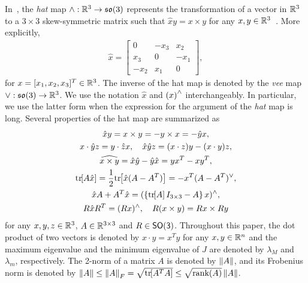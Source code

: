 \documentclass[10pt,fleqn]{IJCAS}  %
\begin{document}
\begin{multicols}{2}
In~, the \textit{hat} map $\wedge :\mathbb{R}^{3}\rightarrow\mathfrak{so}(3)$ represents the transformation of a vector in $\mathbb{R}^{3}$ to a $3\times 3$ skew-symmetric matrix such that $\hat x y = x\times y$ for any $x,y\in\mathbb{R}^{3}$~\cite{bullo2004}. 
More explicitly,
\begin{align*}
    \hat x = \begin{bmatrix} 0 & -x_3 & x_2 \\ x_3 & 0 & -x_1 \\ -x_2 & x_1 & 0\end{bmatrix},
\end{align*}
for $x=[x_1,x_2,x_3]^T\in\mathbb{R}^{3}$. 
The inverse of the hat map is denoted by the \textit{vee} map $\vee:\mathfrak{so}(3)\rightarrow\mathbb{R}^{3}$. 
We use the notation \( \hat{x}\) and \( \left( x \right)^\wedge\) interchangeably.
In particular, we use the latter form when the expression for the argument of the \textit{hat} map is long. 
Several properties of the hat map are summarized as
\begin{gather}
   \hat x y = x\times y = - y\times x = - \hat y x, \label{eqn:cross_product}\\
    x\cdot \hat y z = y\cdot \hat z x,\quad \hat x\hat y z = (x\cdot z) y - (x\cdot y ) z\label{eqn:STP},\\
    \widehat{x\times y} = \hat x \hat y -\hat y \hat x = yx^T-xy^T,\label{eqn:hatxy}\\
    \mathrm{tr}\negthickspace\left[ A\hat x  \right]=\frac{1}{2}\mathrm{tr}\negthickspace\left[ \hat x (A-A^T) \right]=-x^T (A-A^T)^\vee,\label{eqn:hat1}\\
    \hat x  A+A^T\hat x=(\left\{ \mathrm{tr}\negthickspace\left[ A \right]I_{3\times 3}-A \right\}x)^{\wedge}, \label{eqn:xAAx} \\
    R\hat x R^T = (Rx)^\wedge,\quad 
    R(x\times y) = Rx\times Ry\label{eqn:RxR}
\end{gather}
for any $x,y,z\in\mathbb{R}^{3}$, $A\in\mathbb{R}^{3\times 3}$ and $R\in\mathsf{SO(3)}$. 
Throughout this paper, the dot product of two vectors is denoted by $x\cdot y = x^T y$ for any $x,y\in\mathbb{R}^n$ and the maximum eigenvalue and the minimum eigenvalue of $J$ are denoted by $\lambda_M$ and $\lambda_m$, respectively. 
The 2-norm of a matrix \( A \) is denoted by \( \left\| A \right\| \), and its Frobenius norm is denoted by \( \left\| A \right\| \leq \left\| A \right\|_F = \sqrt{\mathrm{tr}\negthickspace\left[ A^T A \right]} \leq \sqrt{\text{rank}(A)} \left\| A \right\| \).


\end{multicols}
\end{document}
